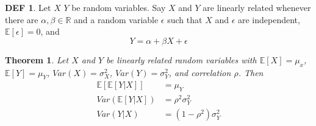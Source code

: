 \documentclass{article}
\newtheorem{theorem}{Theorem}
\theoremstyle{definition}\newtheorem{definition}{DEF}
\theoremstyle{lemma}\newtheorem{lemma}{Lemma}
\theoremstyle{corrolary}\newtheorem{corrolary}{Cor}
\begin{document}
\label{linear_transformations}

\begin{definition}\label{linear_relationship}
Let $X$ $Y$ be random variables.
Say $X$ and $Y$ are linearly related whenever there are $\alpha, \beta\in \mathbb{R}$ and a random variable $\epsilon$ such that $X$ and $\epsilon$ are independent, $\mathbb{E}[\epsilon]=0$, and
\begin{equation}
Y=\alpha +\beta X + \epsilon
\end{equation}
\end{definition}

\begin{theorem}
Let $X$ and $Y$ be linearly related random variables with $\mathbb{E}[X]=\mu_x$, $\mathbb{E}[Y]=\mu_Y$, $Var(X)=\sigma_X^2$, $Var(Y)=\sigma_Y^2$, and correlation $\rho$.
Then
\begin{align}
\mathbb{E}[\mathbb{E}[Y|X]]&=\mu_Y\\
Var(\mathbb{E}[Y|X])&=\rho^2 \sigma_Y^2\\
Var(Y|X)&=(1-\rho^2)\sigma_Y^2
\end{align}
\end{theorem}
\end{document}
